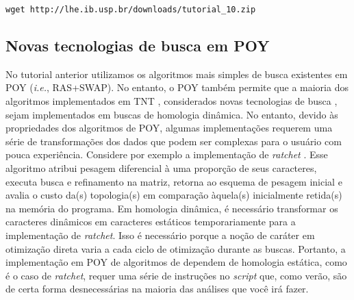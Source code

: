 \begin{center}
\small \texttt{wget http://lhe.ib.usp.br/downloads/tutorial\_10.zip}\\
\end{center}

\newpage
\pagestyle{fancy} %
\begin{refsection}
\renewcommand*{\finalnamedelim}{\addspace\&\space} %
%
\newcommand{\A}{\textcolor{green}{\textbf{A}}}
\newcommand{\C}{\textcolor{blue}{\textbf{C}}}
\newcommand{\G}{\textcolor{gray}{\textbf{G}}}
\newcommand{\T}{\textcolor{red}{\textbf{T}}}
\newcommand{\gap}{\textcolor{black}{\textbf{-}}}


\section{Novas tecnologias de busca em POY}\label{tut10:search}

No tutorial anterior utilizamos os algoritmos mais simples de busca existentes em POY (\textit{i.e.}, RAS+SWAP). No entanto, o POY também permite que a maioria dos algoritmos implementados em TNT \parencite{GoloboffEtAl_2008}, considerados novas tecnologias de busca \parencite{Goloboff_1999,Nixon_1999}, sejam implementados em buscas de homologia dinâmica. No entanto, devido às propriedades dos algoritmos de POY, algumas implementações requerem uma série de transformações dos dados que podem ser complexas para o usuário com pouca experiência. Considere por exemplo a implementação de \textit{ratchet} \parencite{Nixon_1999}. Esse algoritmo atribui pesagem diferencial à uma proporção de seus caracteres, executa busca e refinamento na matriz, retorna ao esquema de pesagem inicial e avalia o custo da(s) topologia(s) em comparação àquela(s) inicialmente retida(s) na memória do programa. Em homologia dinâmica, é necessário transformar os caracteres dinâmicos em caracteres estáticos temporariamente para a implementação de \textit{ratchet}. Isso é necessário porque a noção de caráter em otimização direta varia a cada ciclo de otimização durante as buscas. Portanto, a implementação em POY de algoritmos de dependem de homologia estática, como é o caso de \textit{ratchet}, requer uma série de instruções no \textit{script} que, como verão, são de certa forma desnecessárias na maioria das análises que você irá fazer.


\end{refsection}
